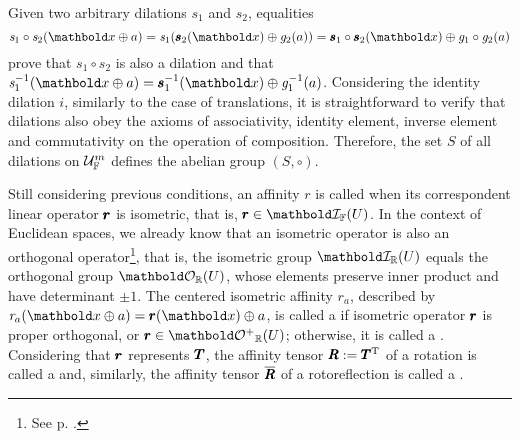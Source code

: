 \begin{figure}[!ht]
\centering
\begin{center}
\scalebox{.72}{} 
\end{center}
\label{fg:dilation}
\end{figure}
Given two arbitrary dilations $\mathit{s}_1$ and $\mathit{s}_2$, equalities
\begin{equation*}
\fua{\mathit{s}_1\circ\mathit{s}_2}{\vto{x}\oplus a}=\fua{\mathit{s}_1}{\fua{\vtf{s}_2}{\vto{x}}\oplus\fua{\mathit{g}_2}{a}}=\fua{\vtf{s}_1\circ\vtf{s}_2}{\vto{x}}\oplus\fua{\mathit{g}_1\circ\mathit{g}_2}{a}
\end{equation*}
prove that $\mathit{s}_1\circ\mathit{s}_2$ is also a dilation and that $\fua{\mathit{s}^{-1}_1}{\vto{x}\oplus a}=\fua{\vtf{s}^{-1}_1}{\vto{x}}\oplus\fua{\mathit{g}^{-1}_1}{a}$. Considering the identity dilation $\mathit{i}$, similarly to the case of translations, it is straightforward to verify that dilations also obey the axioms of associativity, identity element, inverse element and commutativity on the operation of composition. Therefore, the set $S$ of all dilations on $\eamd{U}{F}{m}$ defines the abelian group $(S,\circ)$.


Still considering previous conditions, an affinity $\mathit{r}$ is called  when its correspondent linear operator $\vtf{r}$ is isometric, that is, $\vtf{r}\in\grc{I}{\cam{F}}{U}$. In the context of Euclidean spaces, we already know that an isometric operator is also an orthogonal operator\footnote{See p. \pageref{prg:IsometOrth}.}, that is, the isometric group $\grc{I}{\real}{U}$ equals the orthogonal group $\grc{O}{\real}{U}$, whose elements preserve inner product and have determinant $\pm 1$. The centered isometric affinity $\mathit{r}_a$, described by $\fua{\mathit{r}_a}{\vto{x}\oplus a}=\fua{\vtf{r}}{\vto{x}}\oplus a$, is called a  if isometric operator $\vtf{r}$ is proper orthogonal, or $\vtf{r}\in\grc{O^+}{\real}{U}$; otherwise, it is called a . Considering that $\vtf{r}$ represents $\tnr{T}$, the affinity tensor $\tnr{R}:=\tnr{T}^\text{T}$ of a rotation is called a  and, similarly, the affinity tensor $\overline{\tnr{R}}$ of a rotoreflection is called a . 


